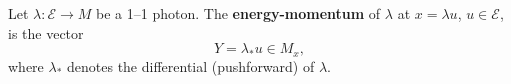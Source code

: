 Let $\lambda: \mathcal{E} \rightarrow M$ be a 1--1 photon. The \textbf{energy-momentum} of $\lambda$ at $x = \lambda u$, $u \in \mathcal{E}$, is the vector
$$
Y = \lambda_* u \in M_x,
$$
where $\lambda_*$ denotes the differential (pushforward) of $\lambda$.
